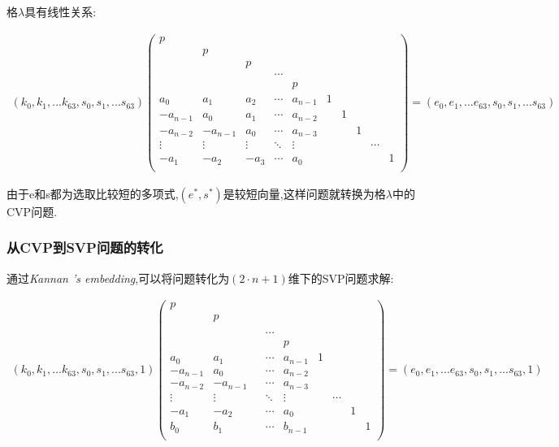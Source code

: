 \documentclass[12pt,a4paper]{article}
\newcommand{\supercite}[2][]{\textsuperscript{\citep[#1]{#2}}}
\numberwithin{equation}{section}
\begin{document}
格$\lambda$具有线性关系:

\begin{align}
	(k_0,k_1,...k_{63},s_0,s_1,...s_{63})
	\left(
	\begin{smallmatrix}
			p\\
			&p\\
			&&p\\
			&&&\cdots\\
			&&&&p\\
			a_0    &a_1    &a_2   &\cdots &a_{n-1}            &1\\
			-a_{n-1}&a_0    &a_1   &\cdots &a_{n-2}       &&1\\
			-a_{n-2}&-a_{n-1}&a_0   &\cdots &a_{n-3}  &&&1\\
			\vdots &\vdots &\vdots&\ddots &\vdots             &&&&\cdots\\
			-a_1    &-a_2    &-a_3   &\cdots &a_0 &&&&&1\\
		\end{smallmatrix}
	\right)
	=
	(e_0,e_1,...e_{63},s_0,s_1,...s_{63})
\end{align}

由于e和s都为选取比较短的多项式,$(e^*,s^*)$是较短向量,这样问题就转换为格$\lambda$中的CVP问题.

\subsubsection{从CVP到SVP问题的转化}
通过\textit{Kannan 's embedding}\supercite[]{kannan1987},可以将问题转化为$(2 \cdot n+1) $维下的SVP问题求解:

\begin{align}
	(k_0,k_1,...k_{63},s_0,s_1,...s_{63},1)
	\left(
	\begin{smallmatrix}
			p\\
			&p\\
			&&\\
			&&&\cdots\\
			&&&&p\\
			a_0    &a_1    &   &\cdots &a_{n-1}            &1\\
			-a_{n-1}&a_0    &   &\cdots &a_{n-2}       &&\\
			-a_{n-2}&-a_{n-1}&   &\cdots &a_{n-3}  &&\\
			\vdots &\vdots &&\ddots &\vdots             &&\cdots\\
			-a_1    &-a_2    &   &\cdots &a_0 &&&1\\
			b_0    &b_1    &   &\cdots &b_{n-1}&&&&1\\
		\end{smallmatrix}
	\right)
	=
	(e_0,e_1,...e_{63},s_0,s_1,...s_{63},1)
\end{align}
\end{document}
